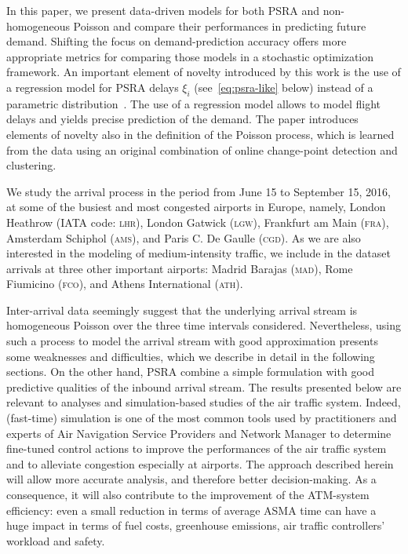 \documentclass[final,review]{elsarticle}
\newcommand{\airp}[1]{\textcolor{#1}{\textsc{#1}}}
\begin{document}
In this paper, we present data-driven models for both \ac{PSRA} and non-homo\-geneous Poisson and compare their performances in predicting future demand.
Shifting the focus on demand-prediction accuracy offers more appropriate metrics for comparing those models in a stochastic optimization framework.
An important element of novelty introduced by this work is the use of a regression model for \ac{PSRA} delays \(\xi_i\) (see~\eqref{eq:psra-like} below) instead of a parametric  distribution~\citep{ball1,guadagni2011queueing,nikoleris2012queueing}.
The use of a regression model allows to model flight delays and yields precise prediction of the demand.
The paper introduces elements of novelty also in the definition of the Poisson process, which is learned from the data using an original combination of online change-point detection and clustering.

We study the arrival process in the period from June 15 to September 15, 2016, at some of the busiest and most congested airports in Europe, namely, London Heathrow (\ac{IATA} code: \airp{lhr}), London Gatwick (\airp{lgw}), Frankfurt am Main (\airp{fra}), Amsterdam Schiphol (\airp{ams}), and Paris C. De Gaulle (\airp{cgd}).
As we are also interested in the modeling of medium-intensity traffic, we include in the dataset arrivals at three other important airports: Madrid Barajas (\airp{mad}), Rome Fiumicino (\airp{fco}), and Athens International (\airp{ath}).

Inter-arrival data seemingly suggest that the underlying arrival stream is homogeneous Poisson over the three time intervals considered.
Nevertheless, using such a process to model the arrival stream with good approximation presents some weaknesses and difficulties, which we describe in detail in the following sections.
On the other hand, \ac{PSRA} combine a simple formulation with good predictive qualities of the inbound arrival stream.
The results presented below are relevant to analyses and simulation-based studies of the air traffic system.
Indeed, (fast-time) simulation is one of the most common tools used by practitioners and experts of Air Navigation Service Providers and Network Manager to determine fine-tuned control actions to improve the performances of the air traffic system and to alleviate congestion especially at airports.
The approach described herein will allow more accurate analysis, and therefore better decision-making.
As a consequence, it will also contribute to the improvement of the ATM-system efficiency: even a small reduction in terms of average \ac{ASMA} time can have a huge impact in terms of fuel costs, greenhouse emissions, air traffic controllers' workload and safety.
\end{document}
